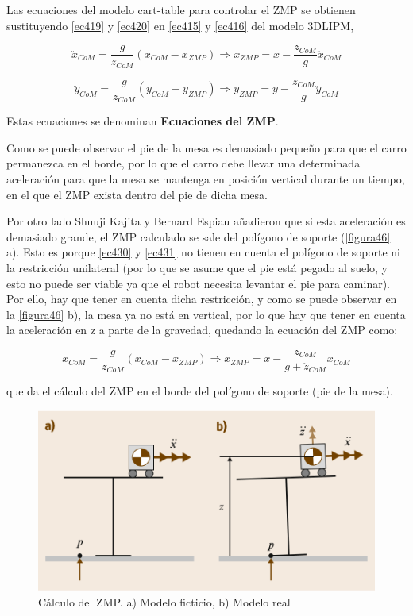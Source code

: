 Las ecuaciones del modelo cart-table para controlar el ZMP se obtienen sustituyendo \ref{ec419} y \ref{ec420} en \ref{ec415} y \ref{ec416} del modelo 3DLIPM,

\begin{equation}
\ddot{x}_{CoM}=\frac{g}{z_{CoM}}\left ( x_{CoM} - x_{ZMP} \right )\Rightarrow x_{ZMP} = x-\frac{z_{CoM}}{g}\ddot{x}_{CoM}
\label{ec430}
\end{equation}

\begin{equation}
\ddot{y}_{CoM}=\frac{g}{z_{CoM}}\left ( y_{CoM} - y_{ZMP} \right )\Rightarrow y_{ZMP} = y-\frac{z_{CoM}}{g}\ddot{y}_{CoM}
\label{ec431}
\end{equation}

Estas ecuaciones se denominan \textbf{Ecuaciones del ZMP}. 

Como se puede observar el pie de la mesa es demasiado pequeño para que el carro permanezca en el borde, por lo que el carro debe llevar una determinada aceleración para que la mesa se mantenga en posición vertical durante un tiempo, en el que el ZMP exista dentro del pie de dicha mesa.

Por otro lado Shuuji Kajita y Bernard Espiau \cite{ref20} añadieron que si esta aceleración es demasiado grande, el ZMP calculado se sale del polígono de soporte (\ref{figura46} a). Esto es porque \ref{ec430} y \ref{ec431} no tienen en cuenta el polígono de soporte ni la restricción unilateral (por lo que se asume que el pie está pegado al suelo, y esto no puede ser viable ya que el robot necesita levantar el pie para caminar). Por ello, hay que tener en cuenta dicha restricción, y como se puede observar en la \ref{figura46} b), la mesa ya no está en vertical, por lo que hay que tener en cuenta la aceleración en z a parte de la gravedad, quedando la ecuación del ZMP como:

\begin{equation}
\ddot{x}_{CoM}=\frac{g}{z_{CoM}}\left ( x_{CoM} - x_{ZMP} \right )\Rightarrow x_{ZMP} = x-\frac{z_{CoM}}{g+\ddot{z}_{CoM}}\ddot{x}_{CoM}
\label{ec432}
\end{equation}

que da el cálculo del ZMP en el borde del polígono de soporte (pie de la mesa). 

\begin{figure}[H]
\centering
\includegraphics[scale=0.6]{imagenes/apartado_4/47_cart_table_real}
\caption{Cálculo del ZMP. a) Modelo ficticio, b) Modelo real}
\label{figura47}
\end{figure}

